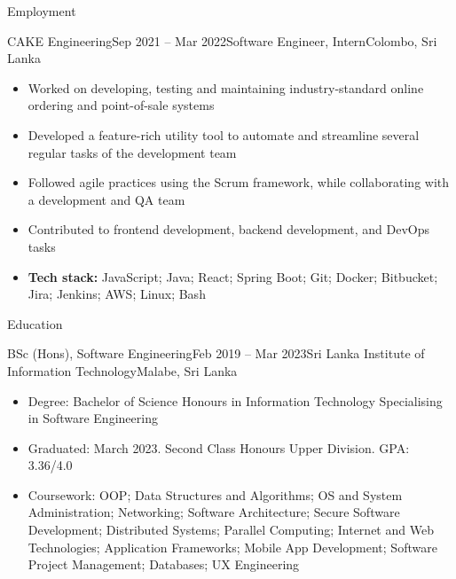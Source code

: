 \documentclass[garamond, a4paper]{modest-cv}
\begin{document}
	\makeheader

	\begin{cvsection}{Employment}
		\begin{cvsubsection}[2]{CAKE Engineering}{Sep 2021 -- Mar 2022}{Software Engineer, Intern}{Colombo, Sri Lanka}
			\begin{itemize}
				\item Worked on developing, testing and maintaining industry-standard online ordering and point-of-sale systems
				\item Developed a feature-rich utility tool to automate and streamline several regular tasks of the development team
				\item Followed agile practices using the Scrum framework, while collaborating with a development and QA team
				\item Contributed to frontend development, backend development, and DevOps tasks
				\item \textbf{Tech stack:} JavaScript; Java; React; Spring Boot; Git; Docker; Bitbucket; Jira; Jenkins; AWS; Linux; Bash
			\end{itemize}
		\end{cvsubsection}
	\end{cvsection}

	\begin{cvsection}{Education}
		\begin{cvsubsection}[2]{BSc (Hons), Software Engineering}{Feb 2019 -- Mar 2023}{Sri Lanka Institute of Information Technology}{Malabe, Sri Lanka}
			\begin{itemize}
				\item Degree: Bachelor of Science Honours in Information Technology Specialising in Software Engineering
				\item Graduated: March 2023. Second Class Honours Upper Division. GPA: 3.36/4.0
				\item Coursework: OOP; Data Structures and Algorithms; OS and System Administration; Networking; Software Architecture; Secure Software Development; Distributed Systems; Parallel Computing; Internet and Web Technologies; Application Frameworks; Mobile App Development; Software Project Management; Databases; UX Engineering
			\end{itemize}
		\end{cvsubsection}
	\end{cvsection}
\end{document}
